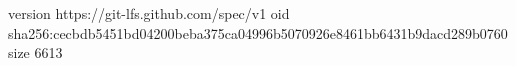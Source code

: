 version https://git-lfs.github.com/spec/v1
oid sha256:cecbdb5451bd04200beba375ca04996b5070926e8461bb6431b9dacd289b0760
size 6613
